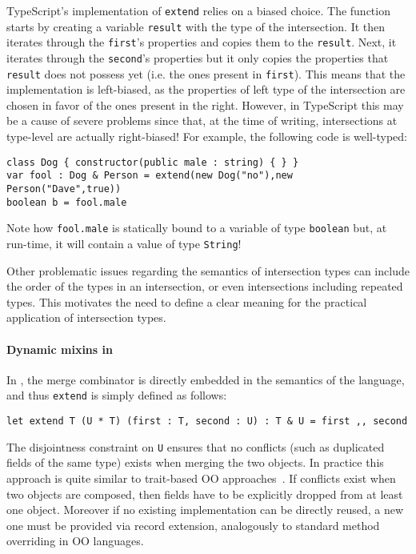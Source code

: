 TypeScript's implementation of \lstinline{extend} relies on a biased choice.
The function starts by creating a variable \lstinline$result$ with the type of the intersection. 
It then iterates through the \lstinline$first$'s properties and copies them to the 
\lstinline$result$.
Next, it iterates through the \lstinline$second$'s properties but it only copies the properties
that \lstinline$result$ does not possess yet (i.e. the ones present in \lstinline$first$).
This means that the implementation is left-biased, as the properties of left type of the intersection
are chosen in favor of the ones present in the right.
However, in TypeScript this may be a cause of severe problems since that, at the time of writing,
intersections at type-level are actually right-biased!
For example, the following code is well-typed:

\begin{lstlisting}
class Dog { constructor(public male : string) { } }
var fool : Dog & Person = extend(new Dog("no"),new Person("Dave",true))
boolean b = fool.male
\end{lstlisting}
Note how \lstinline$fool.male$ is statically bound to a variable of type \lstinline$boolean$ but, at run-time, 
it will contain a value of type \lstinline$String$! 

Other problematic issues regarding the semantics of intersection types can include the order of 
the types in an intersection, or even intersections including repeated types.
This motivates the need to define a clear meaning for the practical application of 
intersection types.

\paragraph{Dynamic mixins in \name}
In \name, the merge combinator is directly embedded in the semantics
of the language, and thus \lstinline{extend} is simply defined as
follows:

\begin{lstlisting}
let extend T (U * T) (first : T, second : U) : T & U = first ,, second 
\end{lstlisting}

\noindent The disjointness constraint on \lstinline{U} ensures that no
conflicts (such as duplicated fields of the same type) exists when merging the two objects. In practice this approach
is quite similar to trait-based OO approaches~\cite{}. If conflicts
exist when two objects are composed, then fields have to be explicitly
dropped from at least one object. Moreover if no existing
implementation can be directly reused, a new one must be provided via
record extension, analogously to standard method overriding in OO
languages.

